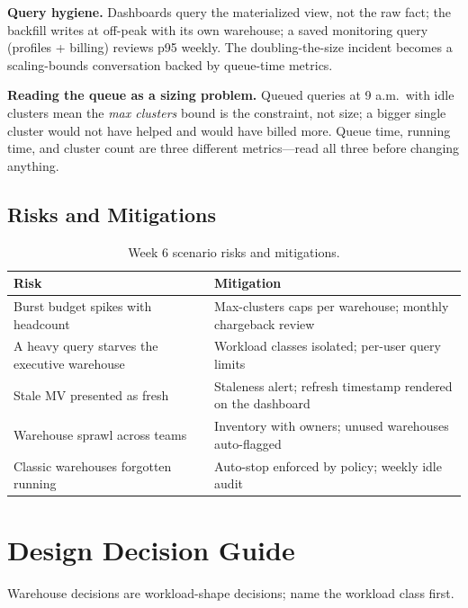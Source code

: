 \textbf{Query hygiene.} Dashboards query the materialized view, not the raw fact; the backfill writes at off-peak with its own warehouse; a saved monitoring query (profiles + billing) reviews p95 weekly. The doubling-the-size incident becomes a scaling-bounds conversation backed by queue-time metrics.

\begin{pitfall}
\textbf{Reading the queue as a sizing problem.} Queued queries at 9 a.m.\ with idle clusters mean the \emph{max clusters} bound is the constraint, not size; a bigger single cluster would not have helped and would have billed more. Queue time, running time, and cluster count are three different metrics---read all three before changing anything.
\end{pitfall}

\subsection{Risks and Mitigations}
\begin{table}[H]
\centering
\small
\begin{tabular}{@{}p{4.6cm}p{7.6cm}@{}}
\toprule
\textbf{Risk} & \textbf{Mitigation} \\
\midrule
Burst budget spikes with headcount & Max-clusters caps per warehouse; monthly chargeback review \\
A heavy query starves the executive warehouse & Workload classes isolated; per-user query limits \\
Stale MV presented as fresh & Staleness alert; refresh timestamp rendered on the dashboard \\
Warehouse sprawl across teams & Inventory with owners; unused warehouses auto-flagged \\
Classic warehouses forgotten running & Auto-stop enforced by policy; weekly idle audit \\
\bottomrule
\end{tabular}
\caption{Week 6 scenario risks and mitigations.}
\label{tab:ch6-risks}
\end{table}

\section{Design Decision Guide}
%
Warehouse decisions are workload-shape decisions; name the workload class first.

